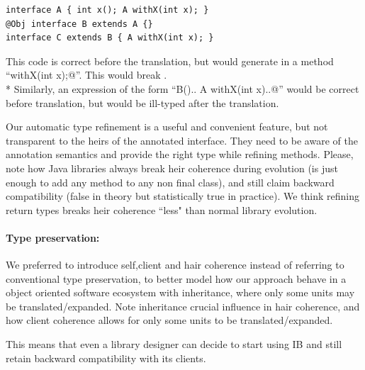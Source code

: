\begin{lstlisting}
interface A { int x(); A withX(int x); }
@Obj interface B extends A {}
interface C extends B { A withX(int x); }
\end{lstlisting}

\noindent This code is correct before the translation, but \mixin would  generate in \Q@B@  a method ``\Q@B withX(int x);@''.
This would break \Q@C@. \\*
Similarly, an expression of the form ``\Q@new B(){.. A withX(int x){..}}@''
would be correct before translation, but would be ill-typed after the translation.

Our automatic type refinement
is a useful and convenient feature, but not transparent to the heirs of the annotated interface.
They need to be aware of the annotation semantics and provide the right type while refining methods.
Please, note how Java libraries always break heir coherence during evolution
 (is just enough to add any method to any non final class), and still claim backward compatibility
 (false in theory but statistically true in practice).
We think refining return types breaks heir coherence ``less" than normal library evolution.

\paragraph{Type preservation:}
We preferred to introduce self,client and hair coherence instead of referring to conventional 
type preservation,
to better model how our approach behave in a object oriented software ecosystem with inheritance,
where only some units may be translated/expanded.
Note inheritance crucial influence in hair coherence, and how client coherence allows 
for only some units to be translated/expanded.

This means that even a library designer can decide to start using IB and still 
retain backward compatibility with its clients.






